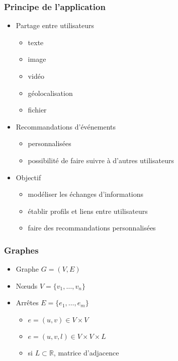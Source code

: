 \documentclass[c]{beamer}
\author{Igor Colin}
\date{\today}
\begin{document}
\begin{frame}
    \frametitle{Principe de l'application}

    \begin{itemize}
        \item Partage entre utilisateurs
            \begin{itemize}
                \item texte
                \item image
                \item vidéo
                \item géolocalisation
                \item fichier
            \end{itemize}
        \item Recommandations d'événements
            \begin{itemize}
                \item personnalisées
                \item possibilité de faire suivre à d'autres utilisateurs
            \end{itemize}
        \item Objectif
            \begin{itemize}
                \item modéliser les échanges d'informations
                \item établir profils et liens entre utilisateurs
                \item faire des recommandations personnalisées
            \end{itemize}
    \end{itemize}
\end{frame}

\begin{frame}
    \frametitle{Graphes}

    \begin{itemize}
        \item Graphe $G = (V,E)$
        \item N\oe{}uds $V = \{v_1,\ldots,v_n\}$
        \item Arrêtes $E = \{e_1,\ldots,e_m\}$
            \begin{itemize}
                \item $e = (u,v) \in V \times V$
                \item $e = (u,v,l) \in V \times V \times L$
                \item si $L \subset \mathbb{R}$, matrice d'adjacence
            \end{itemize}
    \end{itemize}
\end{frame}
\end{document}
